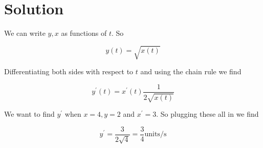 \documentclass[10pt]{article}
\begin{document}
\section*{Solution}
We can write $y, x$ as functions of $t$. So

$$
y(t)=\sqrt{x(t)}
$$

Differentiating both sides with respect to $t$ and using the chain rule we find

$$
y^{\prime}(t)=x^{\prime}(t) \frac{1}{2 \sqrt{x(t)}}
$$

We want to find $y^{\prime}$ when $x=4, y=2$ and $x^{\prime}=3$. So plugging these all in we find

$$
y^{\prime}=\frac{3}{2 \sqrt{4}}=\frac{3}{4} \mathrm{units} / \mathrm{s}
$$
\end{document}
